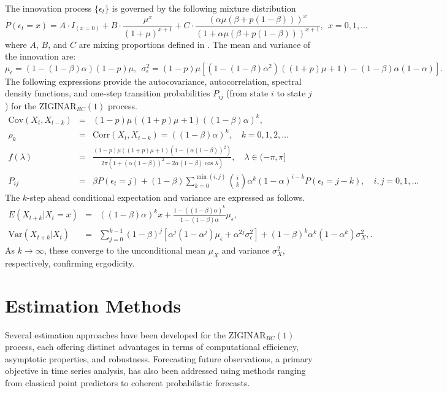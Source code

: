 \documentclass[twoside]{article}
\begin{document}
The innovation process $\{\epsilon_t\}$ is governed by the following mixture distribution
\begin{equation*}
P(\epsilon_t = x) = A \cdot I_{(x=0)} + B \cdot \frac{\mu^x}{(1+\mu)^{x+1}} + C \cdot \frac{(\alpha\mu(\beta+p(1-\beta)))^x}{(1+\alpha\mu(\beta+p(1-\beta)))^{x+1}},\ \ x=0,1,\ldots
\end{equation*}
where $A$, $B$, and $C$ are mixing proportions defined in \cite{Bakouch:2018}. The mean and variance of the innovation are:
\begin{equation*}
\mu_\epsilon = (1-(1-\beta)\alpha)(1-p)\mu,\ \ 
\sigma_\epsilon^2 = (1-p)\mu\left[(1-(1-\beta)\alpha^2)((1+p)\mu+1)-(1-\beta)\alpha(1-\alpha)\right].
\end{equation*}
The following expressions provide the autocovariance, autocorrelation, spectral density functions, and one-step transition probabilities $P_{ij}$ (from state $i$ to state $j$) for the $\text{ZIGINAR}_{RC}(1)$ process.
\begin{eqnarray*}
\text{Cov}(X_t, X_{t-k}) &=& (1-p)\mu((1+p)\mu+1)((1-\beta)\alpha)^k,\\
\rho_k &=& \text{Corr}(X_t, X_{t-k}) = ((1-\beta)\alpha)^k, \quad k=0,1,2,\ldots \\
f(\lambda) &=& \frac{(1-p)\mu((1+p)\mu+1)(1-(\alpha(1-\beta))^2)}{2\pi(1+(\alpha(1-\beta))^2-2\alpha(1-\beta)\cos\lambda)}, \quad \lambda\in(-\pi,\pi]\\
P_{ij}& =& \beta P(\epsilon_t=j) + (1-\beta)\sum_{k=0}^{\min(i,j)} \binom{i}{k}\alpha^k(1-\alpha)^{i-k}P(\epsilon_t=j-k), \quad i,j=0,1,\ldots
\end{eqnarray*}
The $k$-step ahead conditional expectation and variance are expressed as follows.
\begin{eqnarray}
\label{Expect}
E(X_{t+k}|X_t=x) &= &((1-\beta)\alpha)^k x + \frac{1-((1-\beta)\alpha)^k}{1-(1-\beta)\alpha}\mu_\epsilon,\\
\text{Var}(X_{t+k}|X_t) &=& \sum_{j=0}^{k-1}(1-\beta)^j\left[\alpha^j(1-\alpha^j)\mu_\epsilon + \alpha^{2j}\sigma_\epsilon^2\right] + (1-\beta)^k\alpha^k(1-\alpha^k)\sigma_X^2,\nonumber.
\end{eqnarray}
As $k\to\infty$, these converge to the unconditional mean $\mu_X$ and variance $\sigma_X^2$, respectively, confirming ergodicity.

\section{Estimation Methods}
Several estimation approaches have been developed for the $\text{ZIGINAR}_{RC}(1)$ process, each offering distinct advantages in terms of computational efficiency, asymptotic properties, and robustness. Forecasting future observations, a primary objective in time series analysis, has also been addressed using methods ranging from classical point predictors to coherent probabilistic forecasts.
\end{document}

